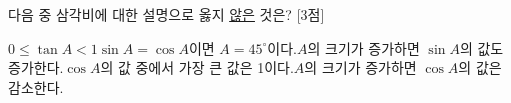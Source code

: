 다음 중 삼각비에 대한 설명으로 옳지 \underline{않은} 것은?  \mbox{[3점]}
\begin{choicesv}{$0\le\tan A<1$}{$\sin A=\cos A$이면 $A=45^\circ$이다.}{$A$의 크기가 증가하면 $\sin A$의 값도 증가한다.}{$\cos A$의 값 중에서 가장 큰 값은 1이다.}{$A$의 크기가 증가하면 $\cos A$의 값은 감소한다.}\end{choicesv}
